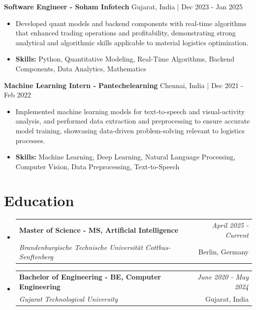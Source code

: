 \documentclass[a4paper,11pt]{article}
\makeatletter
\newcommand{\resumeSubheading}[4]{
\vspace{0.5mm}\item
    \begin{tabular*}{\linewidth}[t]{l@{\extracolsep{\fill}}r}
        \textbf{#1} & \textit{\footnotesize{#4}} \\
        \textit{\footnotesize{#3}} &  \footnotesize{#2}\\
    \end{tabular*}
    \vspace{-2.4mm}
}
\makeatother
\begin{document}
\vspace{1mm}
  \textbf{Software Engineer - Soham Infotech} \hfill Gujarat, India | Dec 2023 - Jan 2025
\vspace{-1.5mm} %
\begin{itemize}
  \item Developed quant models and backend components with real-time algorithms that enhanced trading operations and profitability, demonstrating strong analytical and algorithmic skills applicable to material logistics optimization.

\vspace{-2mm}
  \item \textbf{Skills:} Python, Quantitative Modeling, Real-Time Algorithms, Backend Components, Data Analytics, Mathematics
\end{itemize}

\vspace{1mm}
  \textbf{Machine Learning Intern - Pantechelearning} \hfill Chennai, India | Dec 2021 - Feb 2022
\vspace{-1.5mm} %
\begin{itemize}
  \item Implemented machine learning models for text-to-speech and visual-activity analysis, and performed data extraction and preprocessing to ensure accurate model training, showcasing data-driven problem-solving relevant to logistics processes.
\vspace{-2mm}
  \item \textbf{Skills:} Machine Learning, Deep Learning, Natural Language Processing, Computer Vision, Data Preprocessing, Text-to-Speech
\end{itemize}\section{\textbf{Education}}
\vspace{-0.4mm}

\begin{itemize}[leftmargin=0.15in, label={}]
\resumeSubheading
{Master of Science - MS, Artificial Intelligence }{Berlin, Germany}
{Brandenburgische Technische Universität Cottbus-Senftenberg  }{April 2025 - Current}

\vspace{1.0mm} %
\resumeSubheading
{Bachelor of Engineering - BE, Computer Engineering  }{Gujarat, India}
{Gujarat Technological University }{June 2020 - May 2024}

\end{itemize}
\end{document}
